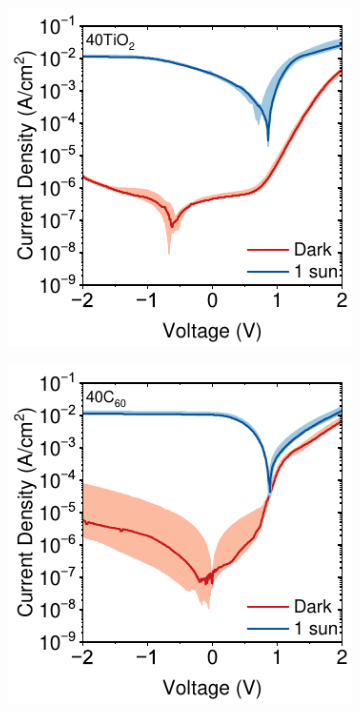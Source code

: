 \begin{figure}[ht!]
    \centering

    \begin{subfigure}[b]{0.32\textwidth}
        \centering
        \includegraphics[width=\textwidth]{chapters/transport_layers/images/JV_Median_40TiO2.pdf}
        \caption{}
    \end{subfigure}
    \hfill
    \begin{subfigure}[b]{0.32\textwidth}
        \centering
        \includegraphics[width=\textwidth]{chapters/transport_layers/images/JV_Median_40C60.pdf}

\end{subfigure}
\end{figure}
